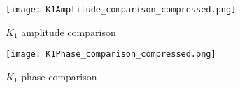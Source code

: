\documentclass[11pt]{report}
\begin{document}
\begin{figure}
    \begin{minipage}{.5\textwidth}
    \centering
    \texttt{[image: K1Amplitude\_comparison\_compressed.png]}
    \caption{$K_1$ amplitude comparison}
    \label{fig:K1Amplitude}
    \end{minipage}
    \begin{minipage}{.5\textwidth}
    \centering
    \texttt{[image: K1Phase\_comparison\_compressed.png]}
    \caption{$K_1$ phase comparison}
    \label{fig:K1Phase}
    \end{minipage}
\end{figure}



\end{document}
